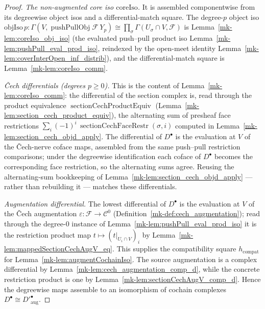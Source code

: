 \begin{proof}
  \emph{The non-augmented core iso \(\mathrm{coreIso}\).} It is assembled componentwise from
  its degreewise object isos and a differential-match square. The degree-\(p\) object iso
  \(\mathrm{objIso}\,p : \Gamma(V,
  \operatorname{pushPullObj}\mathcal{F}\,Y_p) \cong \prod_\sigma \Gamma(U_\sigma \cap V,
  \mathcal{F})\) is Lemma~\ref{mk-lem:coreIso_obj_iso} (the evaluated push--pull product iso
  Lemma~\ref{mk-lem:pushPull_eval_prod_iso}, reindexed by the open-meet identity
  Lemma~\ref{mk-lem:coverInterOpen_inf_distrib}), and the differential-match square is
  Lemma~\ref{mk-lem:coreIso_comm}.

  \emph{{\v C}ech differentials (degrees \(p \geq 0\)).} This is the content of
  Lemma~\ref{mk-lem:coreIso_comm}: the differential of the section complex is, read through the
  product equivalence \(\operatorname{sectionCechProductEquiv}\)
  (Lemma~\ref{mk-lem:section_cech_product_equiv}), the alternating sum of presheaf face
  restrictions \(\sum_i (-1)^i\, \operatorname{sectionCechFaceRestr}(\sigma, i)\) computed in
  Lemma~\ref{mk-lem:section_cech_objd_apply}. The differential of \(D^\bullet\) is the
  evaluation at \(V\) of the {\v C}ech-nerve coface maps, assembled from the same push--pull
  restriction comparisons; under the degreewise identification each coface of \(D^\bullet\)
  becomes the corresponding face restriction, so the alternating sums agree. Reusing the
  alternating-sum bookkeeping of Lemma~\ref{mk-lem:section_cech_objd_apply} --- rather than
  rebuilding it --- matches these differentials.

  \emph{Augmentation differential.} The lowest differential of \(D^\bullet\) is the evaluation
  at \(V\) of the {\v C}ech augmentation \(\varepsilon : \mathcal{F} \to \mathcal{C}^0\)
  (Definition~\ref{mk-def:cech_augmentation}); read through the degree-\(0\) instance of
  Lemma~\ref{mk-lem:pushPull_eval_prod_iso} it is the restriction product map
  \(t \mapsto (t|_{U_i \cap V})_i\) by
  Lemma~\ref{mk-lem:mappedSectionCechAugV_eq}. This supplies the compatibility square
  \(h_{\mathrm{compat}}\) for Lemma~\ref{mk-lem:augmentCochainIso}. The source augmentation is a
  complex differential by Lemma~\ref{mk-lem:cech_augmentation_comp_d}, while the concrete
  restriction product is one by Lemma~\ref{mk-lem:sectionCechAugV_comp_d}. Hence the degreewise maps
  assemble to an
  isomorphism of cochain complexes \(D^\bullet \cong D'^\bullet_{\mathrm{aug}}\).
\end{proof}


